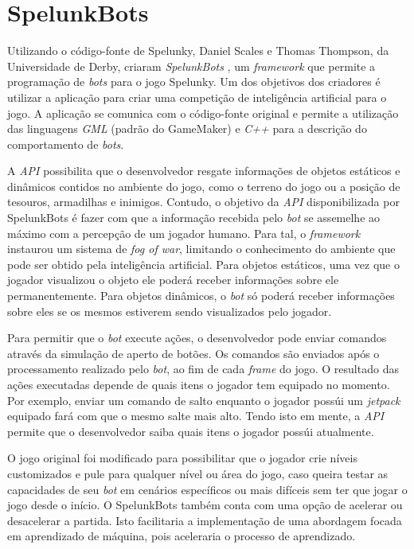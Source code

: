 \section{SpelunkBots}
Utilizando o código-fonte de Spelunky, Daniel Scales e Thomas Thompson, da
Universidade de Derby, criaram \textit{SpelunkBots} \cite{SPELUNKBOTSWEB}, um
\textit{framework} que permite a programação de \textit{bots} para o jogo
Spelunky. Um dos objetivos dos criadores é utilizar a aplicação para criar uma
competição de inteligência artificial para o jogo. A aplicação se comunica com
o código-fonte original e permite a utilização das linguagens \textit{GML}
(padrão do GameMaker) e \textit{C++} para a descrição do comportamento de
\textit{bots}.

A \textit{API} possibilita que o desenvolvedor resgate informações de objetos
estáticos e dinâmicos contidos no ambiente do jogo, como o terreno do jogo ou a
posição de tesouros, armadilhas e inimigos. Contudo, o objetivo da \textit{API}
disponibilizada por SpelunkBots é fazer com que a informação recebida pelo
\textit{bot} se assemelhe ao máximo com a percepção de um jogador humano.  Para
tal, o \textit{framework} instaurou um sistema de \textit{fog of war},
limitando o conhecimento do ambiente que pode ser obtido pela inteligência
artificial.  Para objetos estáticos, uma vez que o jogador visualizou o objeto
ele poderá receber informações sobre ele permanentemente. Para objetos
dinâmicos, o \textit{bot} só poderá receber informações sobre eles se os mesmos
estiverem sendo visualizados pelo jogador.

Para permitir que o \textit{bot} execute ações, o desenvolvedor pode enviar
comandos através da simulação de aperto de botões. Os comandos são enviados após
o processamento realizado pelo \textit{bot}, ao fim de cada \textit{frame} do
jogo. O resultado das ações executadas depende de quais itens o jogador tem
equipado no momento. Por exemplo, enviar um comando de salto enquanto o jogador
possúi um \textit{jetpack} equipado fará com que o mesmo salte mais alto. Tendo
isto em mente, a \textit{API} permite que o desenvolvedor saiba quais itens o
jogador possúi atualmente.

O jogo original foi modificado para possibilitar que o jogador crie níveis
customizados e pule para qualquer nível ou área do jogo, caso queira testar as
capacidades de seu \textit{bot} em cenários específicos ou mais difíceis sem
ter que jogar o jogo desde o início. O SpelunkBots também conta com uma opção
de acelerar ou desacelerar a partida. Isto facilitaria a implementação de uma
abordagem focada em aprendizado de máquina, pois aceleraria o processo de
aprendizado.


